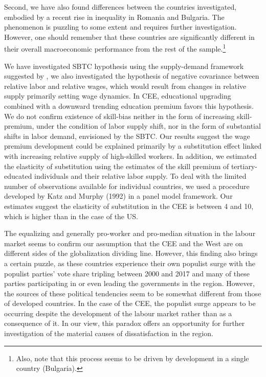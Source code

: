 \documentclass[11pt]{article}
\begin{document}
Second, we have also found differences between the countries investigated, embodied by a recent rise in inequality in Romania and Bulgaria. The phenomenon is puzzling to some extent and requires further investigation. However, one should remember that these countries are significantly different in their overall macroeconomic performance from the rest of the sample.\footnote{
Also, note that this process seems to be driven by development in a single country (Bulgaria).}

 We have investigated SBTC hypothesis using the supply-demand framework suggested by \citeauthor{katz1992changes}, we also investigated the hypothesis of negative covariance between relative labor and relative wages, which would result from changes in relative supply primarily setting wage dynamics. In CEE, educational upgrading combined with a downward trending education premium favors this hypothesis. 
 We do not confirm existence of skill-bias neither in the form of increasing skill-premium, under the condition of labor supply shift, nor in the form of substantial shifts in labor demand, envisioned by the SBTC. Our results suggest the wage premium development could be explained primarily by a substitution effect linked with increasing relative supply of high-skilled workers. In addition, we estimated the elasticity of substitution using the estimates of the skill premium of tertiary-educated individuals and their relative labor supply. To deal with the limited number of observations available for individual countries, we used a procedure developed by Katz and Murphy (1992) in a panel model framework. Our estimates suggest the elasticity of substitution in the CEE is between 4 and 10, which is higher than in the case of the US.


The equalizing and generally pro-worker and pro-median situation in the labour market seems to confirm our assumption that the CEE and the West are on different sides of the globalization dividing line. However, this finding also brings a certain puzzle, as these countries experience their own populist surge with the populist parties' vote share tripling between 2000 and 2017 and many of these parties participating in or even leading the governments in the region. However, the sources of these political tendencies seem to be somewhat different from those of developed countries. In the case of the CEE, the populist surge appears to be occurring despite the development of the labour market rather than as a consequence of it. In our view, this paradox offers an opportunity for further investigation of the material causes of dissatisfaction in the region.
\end{document}
